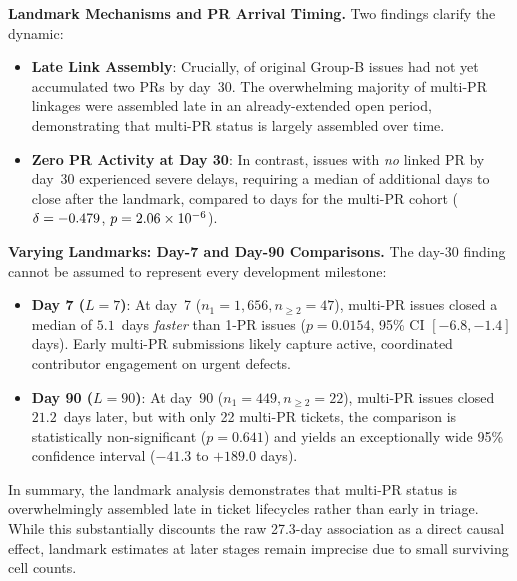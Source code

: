 

\textbf{Landmark Mechanisms and PR Arrival Timing.}
Two findings clarify the dynamic:
\begin{itemize}
  \item \textbf{Late Link Assembly}: Crucially, \textbf{\vallmShareB{}} of original Group-B issues had not yet accumulated two PRs by day~30. The overwhelming majority of multi-PR linkages were assembled late in an already-extended open period, demonstrating that multi-PR status is largely assembled over time.
  \item \textbf{Zero PR Activity at Day 30}: In contrast, issues with \emph{no} linked PR by day~30 experienced severe delays, requiring a median of \vallmMedZ{} additional days to close after the landmark, compared to \vallmMedM{} days for the multi-PR cohort ($\delta = -0.479$, $p = 2.06\times 10^{-6}$).
\end{itemize}

\textbf{Varying Landmarks: Day-7 and Day-90 Comparisons.}
The day-30 finding cannot be assumed to represent every development milestone:
\begin{itemize}
  \item \textbf{Day 7 ($L=7$)}: At day~7 ($n_1=1{,}656, n_{\ge 2}=47$), multi-PR issues closed a median of $5.1$~days \emph{faster} than 1-PR issues ($p=0.0154$, 95\% CI $[-6.8, -1.4]$ days). Early multi-PR submissions likely capture active, coordinated contributor engagement on urgent defects.
  \item \textbf{Day 90 ($L=90$)}: At day~90 ($n_1=449, n_{\ge 2}=22$), multi-PR issues closed $21.2$~days later, but with only 22 multi-PR tickets, the comparison is statistically non-significant ($p=0.641$) and yields an exceptionally wide 95\% confidence interval ($-41.3$ to $+189.0$ days).
\end{itemize}

In summary, the landmark analysis demonstrates that multi-PR status is overwhelmingly assembled late in ticket lifecycles rather than early in triage. While this substantially discounts the raw 27.3-day association as a direct causal effect, landmark estimates at later stages remain imprecise due to small surviving cell counts.
